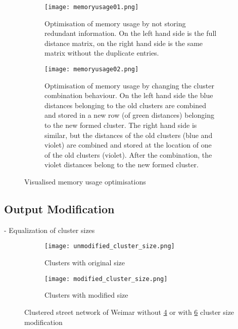 \begin{figure}
    \centering
    \begin{subfigure}[b]{\textwidth}
        \texttt{[image: memoryusage01.png]}
        \caption{Optimisation of memory usage by not storing redundant information. On the left hand side is the full distance matrix, on the right hand side is the same matrix without the duplicate entries.}
        \label{fig:memory_usage_01}
    \end{subfigure}
    \par\medskip
    \begin{subfigure}[b]{\textwidth}
        \texttt{[image: memoryusage02.png]}
        \caption{Optimisation of memory usage by changing the cluster combination behaviour. On the left hand side the blue distances belonging to the old clusters are combined and stored in a new row (of green distances) belonging to the new formed cluster. The right hand side is similar, but the distances of the old clusters (blue and violet) are combined and stored at the location of one of the old clusters (violet). After the combination, the violet distances belong to the new formed cluster.}
        \label{fig:memory_usage_02}
    \end{subfigure}
    \caption{Visualised memory usage optimisations}
\end{figure}

\subsection{Output Modification}
- Equalization of cluster sizes

\begin{figure}
    \centering
    \begin{subfigure}[b]{0.49\textwidth}
        \begin{mdframed}[style=mdthight, userdefinedwidth=0.9\linewidth]
            \texttt{[image: unmodified\_cluster\_size.png]}
        \end{mdframed}
        \caption{Clusters with original size}
        \label{fig:unmodified_cluster_size}
    \end{subfigure}
    \begin{subfigure}[b]{0.49\textwidth}
        \begin{mdframed}[style=mdthight, userdefinedwidth=0.9\linewidth]
            \texttt{[image: modified\_cluster\_size.png]}
        \end{mdframed}
        \caption{Clusters with modified size}
        \label{fig:modified_cluster_size}
    \end{subfigure}
    \caption{Clustered street network of Weimar without \ref{fig:unmodified_cluster_size} or with \ref{fig:modified_cluster_size} cluster size modification}
\end{figure}
